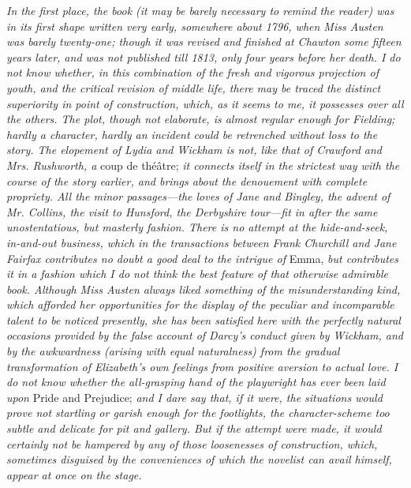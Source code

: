 \documentclass[12pt]{book}
\begin{document}
\textit{In the first place, the book (it may be barely necessary to remind the reader) was in its first shape written very early, somewhere about 1796, when Miss Austen was barely twenty-one; though it was revised and finished at Chawton some fifteen years later, and was not published till 1813, only four years before her death. I do not know whether, in this combination of the fresh and vigorous projection of youth, and the critical revision of middle life, there may be traced the distinct superiority in point of construction, which, as it seems to me, it possesses over all the others. The plot, though not elaborate, is almost regular enough for Fielding; hardly a character, hardly an incident could be retrenched without loss to the story. The elopement of Lydia and Wickham is not, like that of Crawford and Mrs. Rushworth, a} coup de théâtre; \textit{it connects itself in the strictest way with the course of the story earlier, and brings about the denouement with complete propriety. All the minor passages---the loves of Jane and Bingley, the advent of Mr. Collins, the visit to Hunsford, the Derbyshire tour---fit in after the same unostentatious, but masterly fashion. There is no attempt at the hide-and-seek, in-and-out business, which in the transactions between Frank Churchill and Jane Fairfax contributes no doubt a good deal to the intrigue of} Emma, \textit{but contributes it in a fashion which I do not think the best feature of that otherwise admirable book. Although Miss Austen always liked something of the misunderstanding kind, which afforded her opportunities for the display of the peculiar and incomparable talent to be noticed presently, she has been satisfied here with the perfectly natural occasions provided by the false account of Darcy's conduct given by Wickham, and by the awkwardness (arising with equal naturalness) from the gradual transformation of Elizabeth's own feelings from positive aversion to actual love. I do not know whether the all-grasping hand of the playwright has ever been laid upon} Pride and Prejudice; \textit{and I dare say that, if it were, the situations would prove not startling or garish enough for the footlights, the character-scheme too subtle and delicate for pit and gallery. But if the attempt were made, it would certainly not be hampered by any of those loosenesses of construction, which, sometimes disguised by the conveniences of which the novelist can avail himself, appear at once on the stage.}
\end{document}
